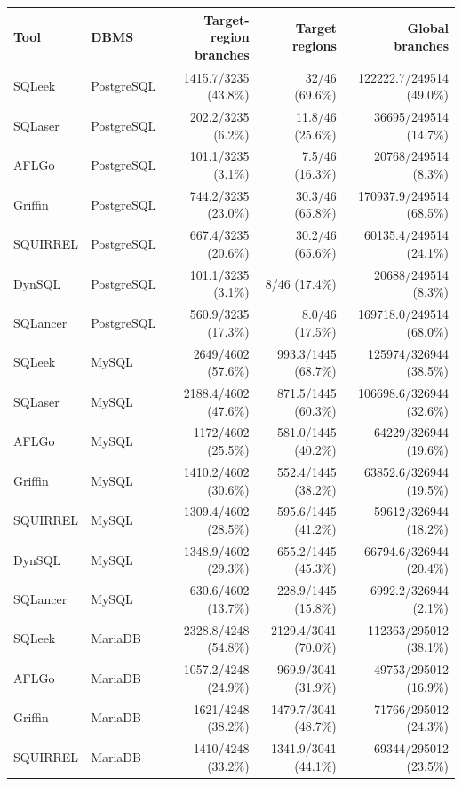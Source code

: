 \begin{tabular}{llrrr}
\hline
Tool & DBMS & Target-region branches & Target regions & Global branches \\
\hline
SQLeek & PostgreSQL & 1415.7/3235 (43.8\%) & 32/46 (69.6\%) & 122222.7/249514 (49.0\%) \\
SQLaser & PostgreSQL & 202.2/3235 (6.2\%) & 11.8/46 (25.6\%) & 36695/249514 (14.7\%) \\
AFLGo & PostgreSQL & 101.1/3235 (3.1\%) & 7.5/46 (16.3\%) & 20768/249514 (8.3\%) \\
Griffin & PostgreSQL & 744.2/3235 (23.0\%) & 30.3/46 (65.8\%) & 170937.9/249514 (68.5\%) \\
SQUIRREL & PostgreSQL & 667.4/3235 (20.6\%) & 30.2/46 (65.6\%) & 60135.4/249514 (24.1\%) \\
DynSQL & PostgreSQL & 101.1/3235 (3.1\%) & 8/46 (17.4\%) & 20688/249514 (8.3\%) \\
SQLancer & PostgreSQL & 560.9/3235 (17.3\%) & 8.0/46 (17.5\%) & 169718.0/249514 (68.0\%) \\
SQLeek & MySQL & 2649/4602 (57.6\%) & 993.3/1445 (68.7\%) & 125974/326944 (38.5\%) \\
SQLaser & MySQL & 2188.4/4602 (47.6\%) & 871.5/1445 (60.3\%) & 106698.6/326944 (32.6\%) \\
AFLGo & MySQL & 1172/4602 (25.5\%) & 581.0/1445 (40.2\%) & 64229/326944 (19.6\%) \\
Griffin & MySQL & 1410.2/4602 (30.6\%) & 552.4/1445 (38.2\%) & 63852.6/326944 (19.5\%) \\
SQUIRREL & MySQL & 1309.4/4602 (28.5\%) & 595.6/1445 (41.2\%) & 59612/326944 (18.2\%) \\
DynSQL & MySQL & 1348.9/4602 (29.3\%) & 655.2/1445 (45.3\%) & 66794.6/326944 (20.4\%) \\
SQLancer & MySQL & 630.6/4602 (13.7\%) & 228.9/1445 (15.8\%) & 6992.2/326944 (2.1\%) \\
SQLeek & MariaDB & 2328.8/4248 (54.8\%) & 2129.4/3041 (70.0\%) & 112363/295012 (38.1\%) \\
AFLGo & MariaDB & 1057.2/4248 (24.9\%) & 969.9/3041 (31.9\%) & 49753/295012 (16.9\%) \\
Griffin & MariaDB & 1621/4248 (38.2\%) & 1479.7/3041 (48.7\%) & 71766/295012 (24.3\%) \\
SQUIRREL & MariaDB & 1410/4248 (33.2\%) & 1341.9/3041 (44.1\%) & 69344/295012 (23.5\%) \\

\end{tabular}

